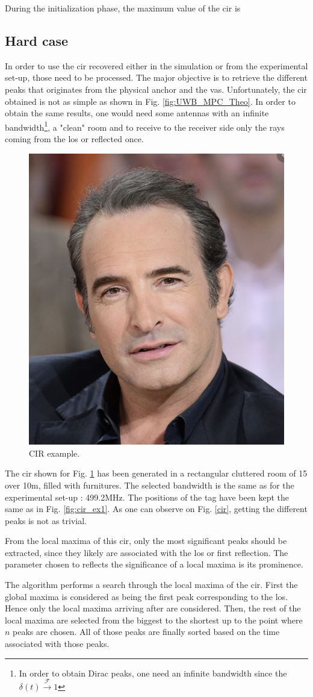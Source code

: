 During the initialization phase, the maximum value of the \gls{cir} is 



\subsection{Hard case}

In order to use the \gls{cir} recovered either in the simulation or from the experimental set-up, those need to be processed. The major objective is to retrieve the different peaks that originates from the physical anchor and the \glspl{va}. Unfortunately, the \gls{cir} obtained is not as simple as shown in Fig. \ref{fig:UWB_MPC_Theo}. In order to obtain the same results, one would need some antennas with an infinite bandwidth\footnote{In order to obtain Dirac peaks, one need an infinite bandwidth since the $\delta(t) \xrightarrow{\mathscr{F}} 1 $}, a "clean" room and to receive to the receiver side only the rays coming from the \gls{los} or reflected once.
\vspace{2mm}

\begin{figure}[H]
\centering
\includegraphics[width=.2\linewidth]{Images/Temporary_pic.png}
\caption{CIR example. \label{fig:cir_example}}
\end{figure}

The \gls{cir} shown for Fig. \ref{fig:cir_example} has been generated in a rectangular cluttered room of 15 over 10m, filled with furnitures. The selected bandwidth is the same as for the experimental set-up : 499.2MHz. The positions of the tag have been kept the same as in Fig. \ref{fig:cir_ex1}. As one can observe on Fig. \ref{cir}, getting the different peaks is not as trivial.
\vspace{2mm}

From the local maxima  of this \gls{cir}, only the most significant peaks should be extracted, since they likely are associated with the \gls{los} or first reflection. The parameter chosen to reflects the significance of a local maxima is its prominence.
\vspace{2mm}

The algorithm performs a search through the local maxima of the \gls{cir}. First the global maxima is considered as being the first peak corresponding to the \gls{los}. Hence only the local maxima arriving after are considered. Then, the rest of the local maxima are selected from the biggest to the shortest up to the point where $n$ peaks are chosen. All of those peaks are finally sorted based on the time associated with those peaks. 

